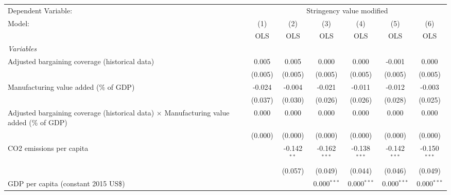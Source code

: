 
\begingroup
\centering
\begin{tabular}{lcccccc}
   \toprule
   Dependent Variable: & \multicolumn{6}{c}{Stringency value modified}\\
   Model:                                                                                          & (1)     & (2)           & (3)            & (4)            & (5)            & (6)\\  
                                                                                                   &  OLS    & OLS           & OLS            & OLS            & OLS            & OLS\\  
   \midrule
   \emph{Variables}\\
   Adjusted bargaining coverage (historical data)                                                  & 0.005   & 0.005         & 0.000          & 0.000          & -0.001         & 0.000\\   
                                                                                                   & (0.005) & (0.005)       & (0.005)        & (0.005)        & (0.005)        & (0.005)\\   
   Manufacturing value added (\% of GDP)                                                           & -0.024  & -0.004        & -0.021         & -0.011         & -0.012         & -0.003\\   
                                                                                                   & (0.037) & (0.030)       & (0.026)        & (0.026)        & (0.028)        & (0.025)\\   
   Adjusted bargaining coverage (historical data) $\times$ Manufacturing value added (\% of GDP)   & 0.000   & 0.000         & 0.000          & 0.000          & 0.000          & 0.000\\   
                                                                                                   & (0.000) & (0.000)       & (0.000)        & (0.000)        & (0.000)        & (0.000)\\   
   CO2 emissions per capita                                                                        &         & -0.142$^{**}$ & -0.162$^{***}$ & -0.138$^{***}$ & -0.142$^{***}$ & -0.150$^{***}$\\   
                                                                                                   &         & (0.057)       & (0.049)        & (0.044)        & (0.046)        & (0.049)\\   
   GDP per capita (constant 2015 US\$)                                                             &         &               & 0.000$^{***}$  & 0.000$^{***}$  & 0.000$^{***}$  & 0.000$^{***}$\\   

\end{tabular}
